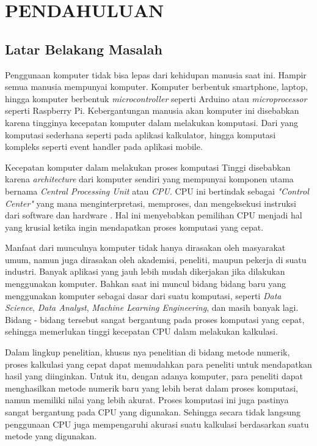 \chapter{PENDAHULUAN}
\setcounter{page}{1}
\section{Latar Belakang Masalah}
\label{latarbelakang}


Penggunaan komputer tidak bisa lepas dari kehidupan manusia saat ini. Hampir
semua manusia mempunyai komputer. Komputer berbentuk smartphone, laptop, hingga
komputer berbentuk \emph{microcontroller} seperti Arduino atau
\emph{microprocessor} seperti Raspberry Pi. Kebergantungan manusia akan
komputer ini disebabkan karena tingginya kecepatan komputer dalam melakukan
komputasi. Dari yang komputasi sederhana seperti pada aplikasi kalkulator,
hingga komputasi kompleks seperti event handler pada aplikasi mobile.


Kecepatan komputer dalam melakukan proses komputasi Tinggi disebabkan karena
\emph{architecture} dari komputer sendiri yang mempunyai komponen utama bernama
\emph{Central Processing Unit} atau \emph{CPU}. CPU ini bertindak sebagai
\emph{"Control Center"} yang mana menginterpretasi, memproses, dan mengeksekusi
instruksi dari software dan hardware \citep{armWhatCentralProcessing2023}. Hal
ini menyebabkan pemilihan CPU menjadi hal yang krusial ketika ingin mendapatkan
proses komputasi yang cepat.


Manfaat dari munculnya komputer tidak hanya dirasakan oleh masyarakat umum,
namun juga dirasakan oleh akademisi, peneliti, maupun pekerja di suatu
industri. Banyak aplikasi yang jauh lebih mudah dikerjakan jika dilakukan
menggunakan komputer. Bahkan saat ini muncul bidang bidang baru yang
menggunakan komputer sebagai dasar dari suatu komputasi, seperti \emph{Data
  Science}, \emph{Data Analyst}, \emph{Machine Learning Engineering}, dan masih
banyak lagi. Bidang - bidang tersebut sangat bergantung pada proses komputasi
yang cepat, sehingga memerlukan tinggi kecepatan CPU dalam melakukan kalkulasi.

Dalam lingkup penelitian, khusus nya penelitian di bidang metode numerik,
proses kalkulasi yang cepat dapat memudahkan para peneliti untuk mendapatkan
hasil yang diinginkan. Untuk itu, dengan adanya komputer, para peneliti dapat
menghasilkan metode numerik baru yang lebih berat dalam proses komputasi, namun
memiliki nilai yang lebih akurat. Proses komputasi ini juga pastinya sangat
bergantung pada CPU yang digunakan. Sehingga secara tidak langsung penggunaan
CPU juga mempengaruhi akurasi suatu kalkulasi berdasarkan suatu metode yang
digunakan.

